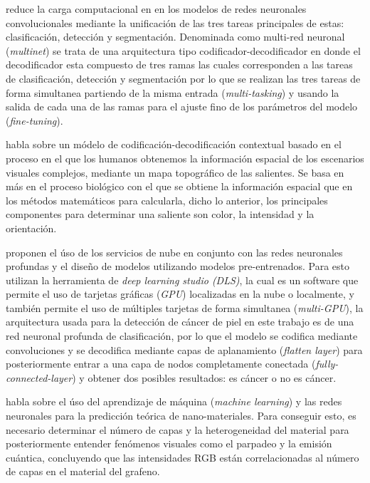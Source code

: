 \citet{DBLP:journals/corr/TeichmannWZCU16} reduce la carga computacional en en los modelos de redes neuronales convolucionales mediante la unificación de las tres tareas principales de estas: clasificación, detección y segmentación. Denominada como multi-red neuronal (\emph{multinet}) se trata de una arquitectura tipo codificador-decodificador en donde el decodificador esta compuesto de tres ramas las cuales corresponden a las tareas de clasificación, detección y segmentación por lo que se realizan las tres tareas de forma simultanea partiendo de la misma entrada (\emph{multi-tasking}) y usando la salida de cada una de las ramas para el ajuste fino de los parámetros del modelo (\emph{fine-tuning}).  

\citet{KRONER2020261} habla sobre un módelo de codificación-decodificación contextual basado en el proceso en el que los humanos obtenemos la información espacial de los escenarios visuales complejos, mediante un mapa topográfico de las salientes. Se basa en más en el proceso biológico con el que se obtiene la información espacial que en los métodos matemáticos para calcularla, dicho lo anterior, los principales componentes para determinar una saliente son color, la intensidad y la orientación.  

\citet{KADAMPUR2020100282} proponen el úso de los servicios de nube en conjunto con las redes neuronales profundas y el diseño de modelos utilizando modelos pre-entrenados. Para esto utilizan la herramienta de \emph{deep learning studio (DLS)}, la cual es un software que permite el uso de tarjetas gráficas (\emph{GPU}) localizadas en la nube o localmente, y también permite el uso de múltiples tarjetas de forma simultanea (\emph{multi-GPU}), la arquitectura usada para la detección de cáncer de piel en este trabajo es de una red neuronal profunda de clasificación, por lo que el modelo se codifica mediante convoluciones y se decodifica mediante capas de aplanamiento (\emph{flatten layer}) para posteriormente entrar a una capa de nodos completamente conectada (\emph{fully-connected-layer}) y obtener dos posibles resultados: es cáncer o no es cáncer.

\citet{zhou2019emerging} habla sobre el úso del aprendizaje de máquina (\emph{machine learning}) y las redes neuronales para la predicción teórica de nano-materiales. Para conseguir esto, es necesario determinar el número de capas y la heterogeneidad del material para posteriormente entender fenómenos visuales como el parpadeo y la emisión cuántica, concluyendo que las intensidades RGB están correlacionadas al número de capas en el material del grafeno. 


